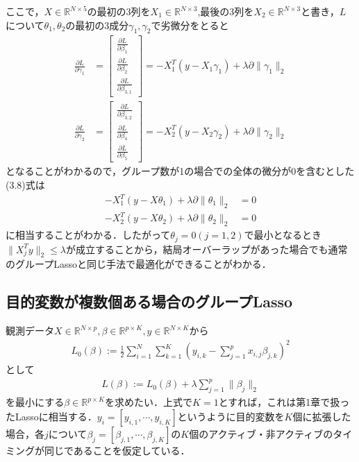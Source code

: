 \documentclass{jsarticle}
\theoremstyle{definition}
\begin{document}
ここで，$X\in\mathbb{R}^{N\times 5}$の最初の3列を$X_1\in \mathbb{R}^{N\times 3}$,最後の3列を$X_2\in \mathbb{R}^{N\times 3}$と書き，$L$について$\theta_1,\theta_2$の最初の3成分$\gamma_1,\gamma_2$で劣微分をとると
\begin{align*}
\frac{\partial L}{\partial \gamma_1}&=\displaystyle\left[\begin{array}{c}
\frac{\partial L}{\partial \beta_1}\\
\frac{\partial L}{\partial \beta_2}\\
\frac{\partial L}{\partial \beta_{3,1}}
\end{array}\right]=-X_1^T(y - X_1 \gamma_1)+\lambda\partial \|\gamma_1\|_2\\
\frac{\partial L}{\partial \gamma_2}&=\left[\begin{array}{c}
\frac{\partial L}{\partial \beta_{3,2}}\\
\frac{\partial L}{\partial \beta_4}\\
\frac{\partial L}{\partial \beta_{5}}
\end{array}\right]=-X_2^T(y - X_2 \gamma_2)+\lambda\partial \|\gamma_2\|_2
\end{align*}
となることがわかるので，グループ数が1の場合での全体の微分が$0$を含むとした(3.8)式は
\begin{align*}
-X_1^T(y - X \theta_1)+\lambda\partial \|\theta_1\|_2&=0\\
-X_2^T(y - X \theta_2)+\lambda\partial \|\theta_2\|_2&=0
\end{align*}
に相当することがわかる．したがって$\theta_j=0(j=1,2)$で最小となるとき$\|X_j^Ty\|_2\leq \lambda$が成立することから，結局オーバーラップがあった場合でも通常のグループLassoと同じ手法で最適化ができることがわかる．\\


\subsection{目的変数が複数個ある場合のグループLasso}
観測データ$X\in \mathbb{R}^{N\times p},\beta\in \mathbb{R}^{p\times K},y\in \mathbb{R}^{N\times K}$から
\begin{align}
\label{l0}
L_0(\beta):=\frac{1}{2}\sum_{i=1}^N\sum_{k=1}^K\left(y_{i,k}-\sum_{j=1}^px_{i,j}\beta_{j,k}\right)^2
\end{align}
として
\begin{align*}
L(\beta):=L_0(\beta)+\lambda\sum_{j=1}^p\|\beta_j\|_2
\end{align*}
を最小にする$\beta\in\mathbb{R}^{p\times K}$を求めたい．上式で$K=1$とすれば，これは第1章で扱ったLassoに相当する．$y_i=[y_{i,1},\cdots,y_{i,K}]$というように目的変数を$K$個に拡張した場合，各$j$について$\beta_j=[\beta_{j,1},\cdots,\beta_{j,K}]$の$K$個のアクティブ・非アクティブのタイミングが同じであることを仮定している．\\
\end{document}
